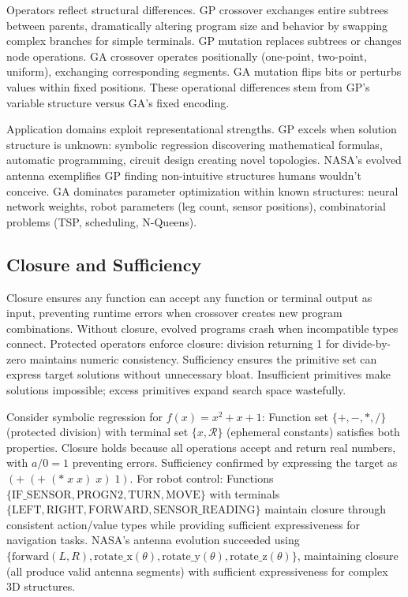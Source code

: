 \documentclass[journal,12pt,onecolumn]{IEEEtran}
\begin{document}
Operators reflect structural differences. GP crossover exchanges entire subtrees between parents, dramatically altering program size and behavior by swapping complex branches for simple terminals. GP mutation replaces subtrees or changes node operations. GA crossover operates positionally (one-point, two-point, uniform), exchanging corresponding segments. GA mutation flips bits or perturbs values within fixed positions. These operational differences stem from GP's variable structure versus GA's fixed encoding.

Application domains exploit representational strengths. GP excels when solution structure is unknown: symbolic regression discovering mathematical formulas, automatic programming, circuit design creating novel topologies. NASA's evolved antenna exemplifies GP finding non-intuitive structures humans wouldn't conceive. GA dominates parameter optimization within known structures: neural network weights, robot parameters (leg count, sensor positions), combinatorial problems (TSP, scheduling, N-Queens).

\subsection{Closure and Sufficiency}

Closure ensures any function can accept any function or terminal output as input, preventing runtime errors when crossover creates new program combinations. Without closure, evolved programs crash when incompatible types connect. Protected operators enforce closure: division returning 1 for divide-by-zero maintains numeric consistency. Sufficiency ensures the primitive set can express target solutions without unnecessary bloat. Insufficient primitives make solutions impossible; excess primitives expand search space wastefully.

Consider symbolic regression for $f(x) = x^2 + x + 1$: Function set $\{+, -, *, /\}$ (protected division) with terminal set $\{x, \mathcal{R}\}$ (ephemeral constants) satisfies both properties. Closure holds because all operations accept and return real numbers, with $a / 0 = 1$ preventing errors. Sufficiency confirmed by expressing the target as $(+ \; (+ \; (* \; x \; x) \; x) \; 1)$. For robot control: Functions $\{\text{IF\_SENSOR}, \text{PROGN2}, \text{TURN}, \text{MOVE}\}$ with terminals $\{\text{LEFT}, \text{RIGHT}, \text{FORWARD}, \text{SENSOR\_READING}\}$ maintain closure through consistent action/value types while providing sufficient expressiveness for navigation tasks. NASA's antenna evolution succeeded using $\{\text{forward}(L,R), \text{rotate\_x}(\theta), \text{rotate\_y}(\theta), \text{rotate\_z}(\theta)\}$, maintaining closure (all produce valid antenna segments) with sufficient expressiveness for complex 3D structures.
\end{document}
